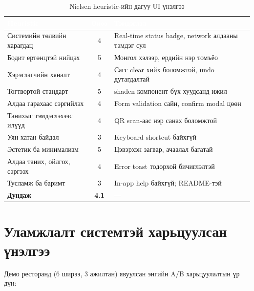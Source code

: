 \begin{table}[htbp]
\caption{Nielsen heuristic-ийн дагуу UI үнэлгээ}
\label{tab:nielsen}
\centering
\small
\begin{tabularx}{\textwidth}{|L|c|L|}
\hline
{}
\textcolor{white}{\textbf{Heuristic}} &
\textcolor{white}{\textbf{Оноо}} &
\textcolor{white}{\textbf{Тэмдэглэл}} \\ \hline
Системийн төлвийн харагдац     & 4 & Real-time status badge, network алдааны тэмдэг сул \\ \hline
{}
Бодит ертөнцтэй нийцэх          & 5 & Монгол хэлээр, ердийн нэр томъёо \\ \hline
Хэрэглэгчийн хяналт             & 4 & Сагс clear хийх боломжтой, undo дутагдалтай \\ \hline
{}
Тогтвортой стандарт             & 5 & shadcn компонент бүх хуудсанд ижил \\ \hline
Алдаа гарахаас сэргийлэх        & 4 & Form validation сайн, confirm modal цөөн \\ \hline
{}
Танихыг тэмдэглэхээс илүүд      & 4 & QR scan-аас нэр санах боломжтой \\ \hline
Уян хатан байдал                & 3 & Keyboard shortcut байхгүй \\ \hline
{}
Эстетик ба минимализм           & 5 & Цэвэрхэн загвар, ачаалал багатай \\ \hline
Алдаа таних, ойлгох, сэргээх    & 4 & Error toast тодорхой бичиглэлтэй \\ \hline
{}
Тусламж ба баримт               & 3 & In-app help байхгүй; README-тэй \\ \hline
\textbf{Дундаж}                & \textbf{4.1} & --- \\ \hline
\end{tabularx}
\end{table}

\section{Уламжлалт системтэй харьцуулсан үнэлгээ}

Демо ресторанд (6 ширээ, 3 ажилтан) явуулсан энгийн A/B харьцуулалтын үр дүн:

